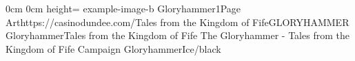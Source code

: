 \documentclass[letterpaper,openany,twoside,twocolumn]{book}
\begin{document}
	\DungeonSheetGeometry

		{0cm}%
		{0cm}%
		{height=\paperheight}%
		{example-image-b}%
		{%
			{Gloryhammer1}{Page \thepage}{Art}{https://casinodundee.com/}{Tales from the Kingdom of Fife}{GLORYHAMMER}%
		}%
		{{\darkcrystalfont}{Gloryhammer}{\digitalfont}{Tales from the Kingdom of Fife}}%
		{{\digitalfont}{The Gloryhammer - Tales from the Kingdom of Fife Campaign}}%
		{GloryhammerIce/black}%
	
	\clearpage
	\setcounter{tocdepth}{2}
	\tableofcontents
	
	
	
\end{document}

